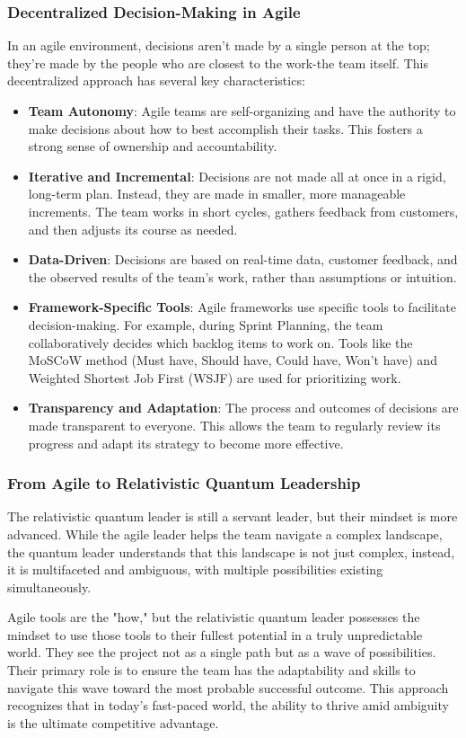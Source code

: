 \documentclass{article}
\begin{document}
\subsubsection*{Decentralized Decision-Making in Agile}
In an agile environment, decisions aren't made by a single person at the top; they're made by the people who are closest to the work-the team itself. This decentralized approach has several key characteristics:
\begin{itemize}
\item \textbf{Team Autonomy}: Agile teams are self-organizing and have the authority to make decisions about how to best accomplish their tasks. This fosters a strong sense of ownership and accountability.
\item \textbf{Iterative and Incremental}: Decisions are not made all at once in a rigid, long-term plan. Instead, they are made in smaller, more manageable increments. The team works in short cycles, gathers feedback from customers, and then adjusts its course as needed.
\item \textbf{Data-Driven}: Decisions are based on real-time data, customer feedback, and the observed results of the team's work, rather than assumptions or intuition.
\item \textbf{Framework-Specific Tools}: Agile frameworks use specific tools to facilitate decision-making. For example, during Sprint Planning, the team collaboratively decides which backlog items to work on. Tools like the MoSCoW method (Must have, Should have, Could have, Won't have) and Weighted Shortest Job First (WSJF) are used for prioritizing work.
\item \textbf{Transparency and Adaptation}: The process and outcomes of decisions are made transparent to everyone. This allows the team to regularly review its progress and adapt its strategy to become more effective.
\end{itemize}

\subsubsection*{From Agile to Relativistic Quantum Leadership}
The relativistic quantum leader is still a servant leader, but their mindset is more advanced. While the agile leader helps the team navigate a complex landscape, the quantum leader understands that this landscape is not just complex, instead, it is multifaceted and ambiguous, with multiple possibilities existing simultaneously.

Agile tools are the "how," but the relativistic quantum leader possesses the mindset to use those tools to their fullest potential in a truly unpredictable world. They see the project not as a single path but as a wave of possibilities. Their primary role is to ensure the team has the adaptability and skills to navigate this wave toward the most probable successful outcome. This approach recognizes that in today's fast-paced world, the ability to thrive amid ambiguity is the ultimate competitive advantage.
\end{document}
